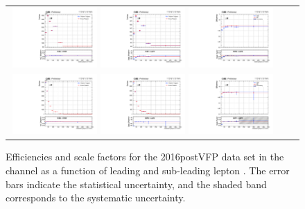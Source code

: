 {\begin{figure}[h]
  \begin{center}
    \begin{tabular}{ccc}
      \includegraphics[width=0.32\textwidth]{fig_2016postVFP_TrigSF/g_lepApt_mumu_MC.pdf}
      \includegraphics[width=0.32\textwidth]{fig_2016postVFP_TrigSF/g_lepApt_mumu_data.pdf}
      \includegraphics[width=0.32\textwidth]{fig_2016postVFP_TrigSF/g_mumu_lepApt_FullSystUncBand.pdf}\\
      \includegraphics[width=0.32\textwidth]{fig_2016postVFP_TrigSF/g_lepBpt_mumu_MC.pdf}
      \includegraphics[width=0.32\textwidth]{fig_2016postVFP_TrigSF/g_lepBpt_mumu_data.pdf}
      \includegraphics[width=0.32\textwidth]{fig_2016postVFP_TrigSF/g_mumu_lepBpt_FullSystUncBand.pdf}\\
    \end{tabular}
    \caption{Efficiencies and scale factors for the 2016postVFP data set in the \mumu channel as a function of leading and sub-leading lepton \pT.
            The error bars indicate the statistical uncertainty, and the shaded band corresponds to the systematic uncertainty.
            }
    \label{TrigSF_2016postVFP_3}
  \end{center}
\end{figure}

}
